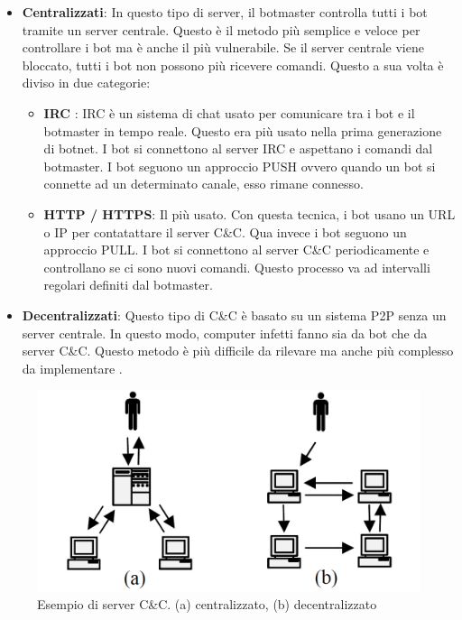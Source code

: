 \documentclass[12pt,a4paper,openright,twoside]{book}
\begin{document}
\begin{itemize}
    \item \textbf{Centralizzati}: In questo tipo di server, il botmaster
    controlla tutti i bot tramite un server centrale. Questo è il metodo
    più semplice e veloce per controllare i bot ma è anche il più vulnerabile.
    Se il server centrale viene bloccato, tutti i bot non possono più
    ricevere comandi. Questo a sua volta è diviso in due categorie:
    \begin{itemize}
        \item \textbf{IRC} : \acrfull{IRC} è un sistema di chat
        usato per comunicare tra i bot e il botmaster in tempo reale.
        Questo era più usato nella prima generazione di botnet. 
        I bot si connettono al server \acrshort{IRC} e aspettano
        i comandi dal botmaster. I bot seguono un approccio PUSH ovvero
        quando un bot si connette ad un determinato canale, esso rimane connesso.
        \item \textbf{HTTP / HTTPS}: Il più usato. Con questa tecnica, i bot usano un URL o IP
        per contatattare il server \acrshort{C&C}. Qua invece i bot seguono
        un approccio PULL. I bot si connettono al server \acrshort{C&C}
        periodicamente e controllano se ci sono nuovi comandi. Questo processo
        va ad intervalli regolari definiti dal botmaster.
    \end{itemize}

    \item \textbf{Decentralizzati}: Questo tipo di \acrshort{C&C}
    è basato su un sistema \acrshort{P2P} senza un server centrale. In questo modo,
    computer infetti fanno sia da bot che da server \acrshort{C&C}.
    Questo metodo è più difficile da rilevare ma anche
    più complesso da implementare \cite{4804459}.

\end{itemize}

\begin{figure}[H]
    \centering
    \includegraphics[width=.8\linewidth]{figures/Types-of-CC.png}
    \caption{Esempio di server \acrshort{C&C}. (a) centralizzato, (b) decentralizzato \cite{6487169}}
    \label{fig:command and control}
\end{figure}
\end{document}
